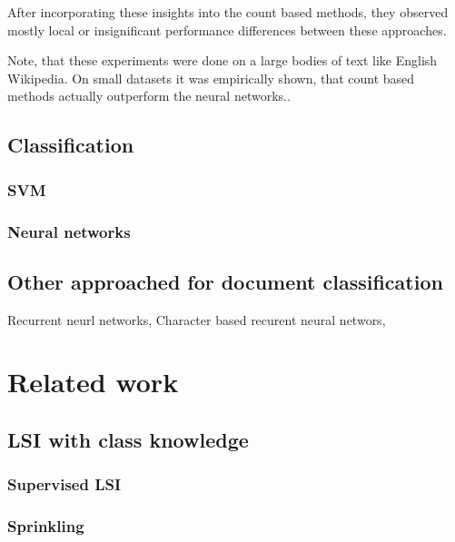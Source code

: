             After incorporating these insights into the count based methods, 
            they observed mostly local or insignificant performance differences between these approaches.
            
            Note, that these experiments were done on a large bodies of text like English Wikipedia.   
            On small datasets it was empirically shown, that count based methods actually outperform the neural networks.\cite{altszyler2016comparative}. %
            
            \* \cite{naili2017comparative} %
            
    
    \section{Classification}
        \subsection{SVM}
            \* %
        \subsection{Neural networks}
    
    \section{Other approached for document classification}
        Recurrent neurl networks,
        Character based recurent neural networs, 

\* %

\chapter{Related work}
    \section{LSI with class knowledge}
        \subsection{Supervised LSI}
            \cite{sun2004supervised} %

        \subsection{Sprinkling}
            \cite{chakraborti2007supervised} %
        
